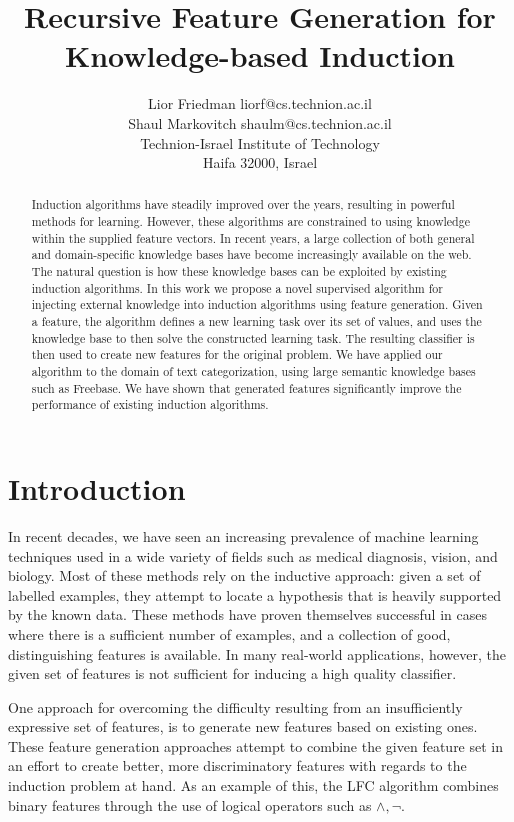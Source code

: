 \documentclass[twoside,11pt]{article}
\title{Recursive Feature Generation for Knowledge-based Induction}
\author{\name Lior Friedman \email liorf@cs.technion.ac.il \\
	\name Shaul Markovitch \email shaulm@cs.technion.ac.il \\
	\addr Technion-Israel Institute of Technology\\
	Haifa 32000, Israel
	}
\theoremstyle{definition}
\begin{document}
\maketitle

\begin{abstract}
  Induction algorithms have steadily improved over the years, resulting in powerful methods for learning. However, these algorithms are constrained to using knowledge within the supplied feature vectors. In recent years, a large collection of both general and domain-specific knowledge bases have become increasingly available on the web. The natural question is how these knowledge bases can be exploited by existing induction algorithms.
  In this work we propose a novel supervised algorithm for injecting external knowledge into induction algorithms using feature generation. Given a feature, the algorithm defines a new learning task over its set of values, and uses the knowledge base to then solve the constructed learning task. The resulting classifier is then used to create new features for the original problem.
  We have applied our algorithm to the domain of text categorization, using large semantic knowledge bases such as Freebase. We have shown that generated features significantly improve the performance of existing induction algorithms.
\end{abstract}

\section{Introduction}
\label{sec:Intro}
In recent decades, we have seen an increasing prevalence of machine learning techniques used in a wide variety of fields such as medical diagnosis, vision, and biology.
Most of these methods rely on the inductive approach: given a set of labelled examples, they attempt to locate a hypothesis that is heavily supported by the known data. These methods have proven themselves successful in cases where there is a sufficient number of examples, and a collection of good,
distinguishing features is available.
In many real-world applications, however, the given set of features is not sufficient for inducing a high quality classifier.

One approach for overcoming the difficulty resulting from an insufficiently expressive set of features, is to generate new features based on existing ones. 
These feature generation approaches attempt to combine the given feature set in an effort to create better, more discriminatory features with regards to the induction problem at hand. As an example of this, the LFC algorithm \cite{ragavan1993complex} combines binary features through the use of logical operators such as $\land ,\lnot$.
\end{document}
